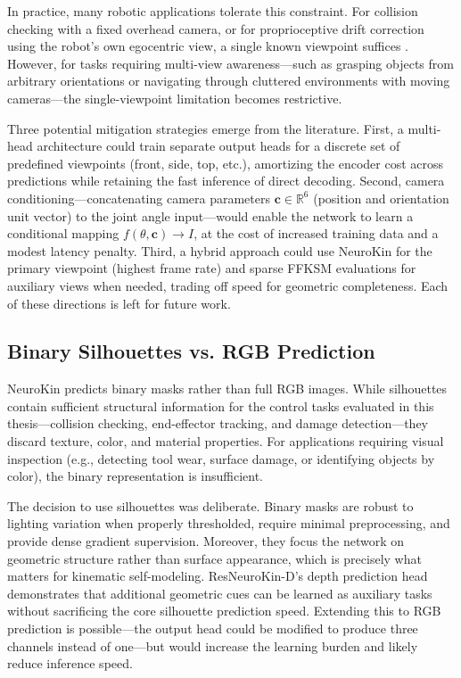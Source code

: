 \documentclass[12pt,a4paper,oneside]{report}
\begin{document}
In practice, many robotic applications tolerate this constraint. For collision checking with a fixed overhead camera, or for proprioceptive drift correction using the robot's own egocentric view, a single known viewpoint suffices \cite{hu2024teaching, chen2022full}. However, for tasks requiring multi-view awareness---such as grasping objects from arbitrary orientations or navigating through cluttered environments with moving cameras---the single-viewpoint limitation becomes restrictive.

Three potential mitigation strategies emerge from the literature. First, a multi-head architecture could train separate output heads for a discrete set of predefined viewpoints (front, side, top, etc.), amortizing the encoder cost across predictions while retaining the fast inference of direct decoding. Second, camera conditioning---concatenating camera parameters $\mathbf{c} \in \mathbb{R}^6$ (position and orientation unit vector) to the joint angle input---would enable the network to learn a conditional mapping $f(\theta, \mathbf{c}) \rightarrow I$, at the cost of increased training data and a modest latency penalty. Third, a hybrid approach could use NeuroKin for the primary viewpoint (highest frame rate) and sparse FFKSM evaluations for auxiliary views when needed, trading off speed for geometric completeness. Each of these directions is left for future work.

\subsection{Binary Silhouettes vs. RGB Prediction}

NeuroKin predicts binary masks rather than full RGB images. While silhouettes contain sufficient structural information for the control tasks evaluated in this thesis---collision checking, end-effector tracking, and damage detection---they discard texture, color, and material properties. For applications requiring visual inspection (e.g., detecting tool wear, surface damage, or identifying objects by color), the binary representation is insufficient.

The decision to use silhouettes was deliberate. Binary masks are robust to lighting variation when properly thresholded, require minimal preprocessing, and provide dense gradient supervision. Moreover, they focus the network on geometric structure rather than surface appearance, which is precisely what matters for kinematic self-modeling. ResNeuroKin-D's depth prediction head demonstrates that additional geometric cues can be learned as auxiliary tasks without sacrificing the core silhouette prediction speed. Extending this to RGB prediction is possible---the output head could be modified to produce three channels instead of one---but would increase the learning burden and likely reduce inference speed.
\end{document}
